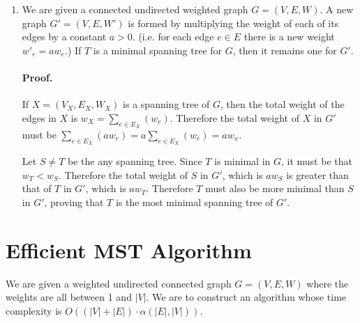 \documentclass{article}
\begin{document}
\begin{enumerate}
	\item
		We are given a connected undirected weighted graph \(G=(V,E,W)\). A new graph \(G' = (V, E, W')\) is formed by multiplying the weight of each of its edges by a constant \(a > 0\). (i.e. for each edge \(e \in E\) there is a new weight \(w'_e = aw_e\).) If \(T\) is a minimal spanning tree for \(G\), then it remains one for \(G'\).

		\paragraph{Proof.} If \(X = (V_X, E_X, W_X)\) is a spanning tree of \(G\), then the total weight of the edges in \(X\) is \(w_X = \sum_{e \in E_X}(w_e)\). Therefore the total weight of \(X\) in \(G'\) must be \(\sum_{e \in E_X}(aw_e) = a \sum_{e \in E_X}(w_e) = aw_x\).

		Let \(S \neq T\) be the any spanning tree. Since \(T\) is minimal in \(G\), it must be that \(w_T < w_S\). Therefore the total weight of \(S\) in \(G'\), which is \(aw_S\) is greater than that of \(T\) in \(G'\), which is \(aw_T\). Therefore \(T\) must also be more minimal than \(S\) in \(G'\), proving that \(T\) is the most minimal spanning tree of \(G'\).
\end{enumerate}

\section{Efficient MST Algorithm}

We are given a weighted undirected connected graph \(G = (V, E, W)\) where the weights are all between 1 and \(|V|\). We are to construct an algorithm whose time complexity is \(O((|V| + |E|) \cdot \alpha(|E|, |V|))\).
\end{document}

